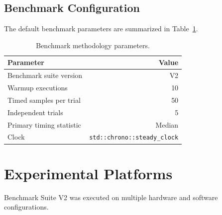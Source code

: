 \documentclass[11pt]{article}
\newcommand{\benchmarkversion}{V2}
\newcommand{\warmups}{10}
\newcommand{\samples}{50}
\newcommand{\trials}{5}
\begin{document}
\subsection{Benchmark Configuration}

The default benchmark parameters are summarized in
Table~\ref{tab:configuration}.

\begin{table}[H]
    \centering
    \begin{tabular}{lr}
        \toprule
        \textbf{Parameter} & \textbf{Value} \\
        \midrule
        Benchmark suite version & \benchmarkversion{} \\
        Warmup executions       & \warmups{} \\
        Timed samples per trial & \samples{} \\
        Independent trials      & \trials{} \\
        Primary timing statistic & Median \\
        Clock & \texttt{std::chrono::steady\_clock} \\
        \bottomrule
    \end{tabular}
    \caption{Benchmark methodology parameters.}
    \label{tab:configuration}
\end{table}


\section{Experimental Platforms}

Benchmark Suite \benchmarkversion{} was executed on multiple
hardware and software configurations.
\end{document}
